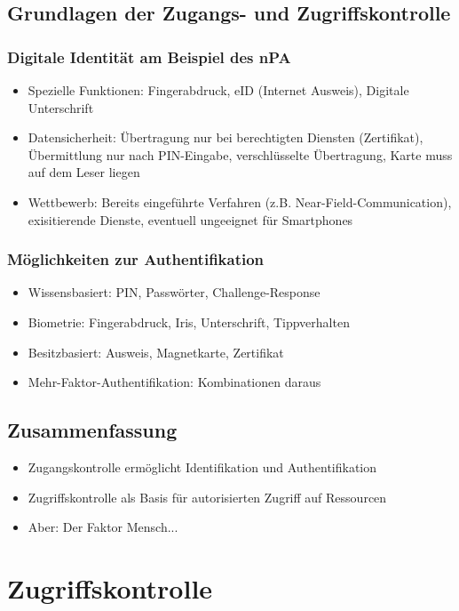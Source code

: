 \subsection{Grundlagen der Zugangs- und Zugriffskontrolle}

\subsubsection{Digitale Identität am Beispiel des nPA}
\begin{itemize}
	\item Spezielle Funktionen: Fingerabdruck, eID (Internet Ausweis), Digitale Unterschrift
	\item Datensicherheit: Übertragung nur bei berechtigten Diensten (Zertifikat), Übermittlung nur nach PIN-Eingabe, verschlüsselte Übertragung, Karte muss auf dem Leser liegen
	\item Wettbewerb: Bereits eingeführte Verfahren (z.B. Near-Field-Communication), exisitierende Dienste, eventuell ungeeignet für Smartphones
\end{itemize}

\subsubsection{Möglichkeiten zur Authentifikation}
\begin{itemize}
	\item Wissensbasiert: PIN, Passwörter, Challenge-Response
	\item Biometrie: Fingerabdruck, Iris, Unterschrift, Tippverhalten
	\item Besitzbasiert: Ausweis, Magnetkarte, Zertifikat
	\item Mehr-Faktor-Authentifikation: Kombinationen daraus
\end{itemize}


\subsection{Zusammenfassung}
\begin{itemize}
	\item Zugangskontrolle ermöglicht Identifikation und Authentifikation
	\item Zugriffskontrolle als Basis für autorisierten Zugriff auf Ressourcen
	\item Aber: Der Faktor Mensch...
\end{itemize}



\section{Zugriffskontrolle}

